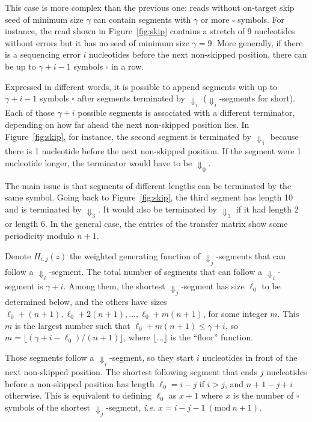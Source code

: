 \documentclass{article}
\newcommand{\modulo}[1]{\ (\mathrm{mod}\ #1)}
\begin{document}
This case is more complex than the previous one: reads without on-target
skip seed of minimum size $\gamma$ can contain segments with $\gamma$ or
more $\square$ symbols. For instance, the read shown in
Figure~\ref{fig:skip} contains a stretch of 9 nucleotides without errors
but it has no seed of minimum size $\gamma=9$. More generally, if there is
a sequencing error $i$ nucleotides before the next non-skipped position,
there can be up to $\gamma+i-1$ symbols $\square$ in a row.

Expressed in different words, it is possible to append segments with up to
$\gamma+i-1$ symbols $\square$ after segments terminated by $\Downarrow_i$
($\Downarrow_i$-segments for short). Each of those $\gamma+i$ possible
segments is associated with a different terminator, depending on how far
ahead the next non-skipped position lies. In Figure~\ref{fig:skip}, for
instance, the second segment is terminated by $\Downarrow_1$ because there
is 1 nucleotide before the next non-skipped position. If the segment were
1 nucleotide longer, the terminator would have to be $\Downarrow_0$.

The main issue is that segments of different lengths can be terminated by
the same symbol. Going back to Figure~\ref{fig:skip}, the third segment
has length 10 and is terminated by $\Downarrow_3$. It would also be
terminated by $\Downarrow_3$ if it had length 2 or length 6. In the
general case, the entries of the transfer matrix show some periodicity
modulo $n+1$.

Denote $H_{i,j}(z)$ the weighted generating function of
$\Downarrow_j$-segments that can follow a $\Downarrow_i$-segment. The
total number of segments that can follow a $\Downarrow_i$-segment is
$\gamma+i$. Among them, the shortest $\Downarrow_j$-segment has size
$\ell_0$ to be determined below, and the others have sizes $\ell_0+(n+1),
\ell_0+2(n+1), \ldots, \ell_0+m(n+1)$, for some integer $m$. This $m$ is
the largest number such that $\ell_0+m(n+1) \leq \gamma+i$, so $m =
\lfloor (\gamma+i-\ell_0)/(n+1)\rfloor$, where $\lfloor \ldots \rfloor$ is
the ``floor'' function.

Those segments follow a $\Downarrow_i$-segment, so they start $i$
nucleotides in front of the next non-skipped position. The shortest
following segment that ends $j$ nucleotides before a non-skipped position
has length $\ell_0 = i-j$ if $i > j$, and $n+1-j+i$ otherwise. This is
equivalent to defining $\ell_0$ as $x+1$ where $x$ is the number of
$\square$ symbols of the shortest $\Downarrow_j$-segment, \textit{i.e.} $x
= i-j-1 \modulo{n+1}$.
\end{document}

